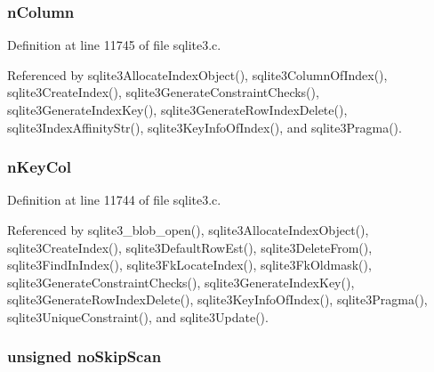 \hypertarget{struct_index_af9c109e52691a25cd6fef2db6db26023}{}
\subsubsection[{n\+Column}]{ n\+Column}\label{struct_index_af9c109e52691a25cd6fef2db6db26023}


Definition at line 11745 of file sqlite3.\+c.



Referenced by sqlite3\+Allocate\+Index\+Object(), sqlite3\+Column\+Of\+Index(), sqlite3\+Create\+Index(), sqlite3\+Generate\+Constraint\+Checks(), sqlite3\+Generate\+Index\+Key(), sqlite3\+Generate\+Row\+Index\+Delete(), sqlite3\+Index\+Affinity\+Str(), sqlite3\+Key\+Info\+Of\+Index(), and sqlite3\+Pragma().

\hypertarget{struct_index_ad021b71c3156753c5b435d50b6e42255}{}
\subsubsection[{n\+Key\+Col}]{ n\+Key\+Col}\label{struct_index_ad021b71c3156753c5b435d50b6e42255}


Definition at line 11744 of file sqlite3.\+c.



Referenced by sqlite3\+\_\+blob\+\_\+open(), sqlite3\+Allocate\+Index\+Object(), sqlite3\+Create\+Index(), sqlite3\+Default\+Row\+Est(), sqlite3\+Delete\+From(), sqlite3\+Find\+In\+Index(), sqlite3\+Fk\+Locate\+Index(), sqlite3\+Fk\+Oldmask(), sqlite3\+Generate\+Constraint\+Checks(), sqlite3\+Generate\+Index\+Key(), sqlite3\+Generate\+Row\+Index\+Delete(), sqlite3\+Key\+Info\+Of\+Index(), sqlite3\+Pragma(), sqlite3\+Unique\+Constraint(), and sqlite3\+Update().

\hypertarget{struct_index_aec7ded06f38b4e8c98929cd2f270e59c}{}
\subsubsection[{no\+Skip\+Scan}]{\setlength{\rightskip}{0pt plus 5cm}unsigned no\+Skip\+Scan}\label{struct_index_aec7ded06f38b4e8c98929cd2f270e59c}


